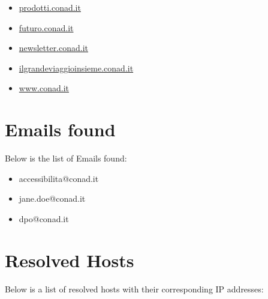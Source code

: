 \documentclass{article}
\begin{document}
\begin{itemize}
        
        
        \item \href{ http://prodotti.conad.it/ }{ prodotti.conad.it }
    
        
        
        \item \href{ https://futuro.conad.it/ }{ futuro.conad.it }
    
        
        
        \item \href{ https://newsletter.conad.it/ }{ newsletter.conad.it }
    
        
        
        \item \href{ https://ilgrandeviaggioinsieme.conad.it/ }{ ilgrandeviaggioinsieme.conad.it }
    
        
        
        \item \href{ https://www.conad.it/servizio-clienti-e-faq?utm\_source=massiva\&utm\_medium=email\&utm\_content=124717596\&utm\_campaign=\_2021\_NON\_CANCELLARE\_Test\_Proof\_Agenzia\&p1=\%2Fnegozio.007471 }{ www.conad.it }
    
\end{itemize}


\section*{Emails found}

Below is the list of Emails found:

\begin{itemize}
    
        \item accessibilita@conad.it
    
        \item jane.doe@conad.it
    
        \item dpo@conad.it
    
\end{itemize}

\section*{Resolved Hosts}

Below is a list of resolved hosts with their corresponding IP addresses:
\end{document}
